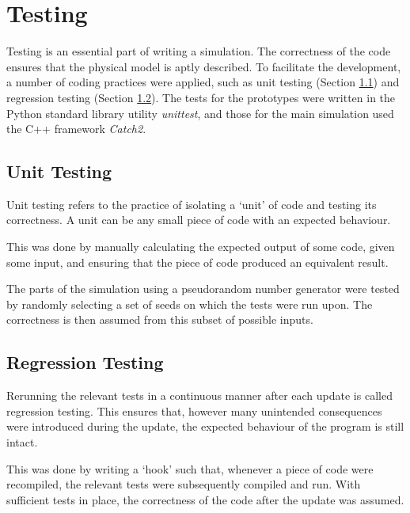 \section{Testing}
\label{sec:Testing}

Testing is an essential part of writing a simulation. The correctness of the code ensures that the physical model is aptly described. To facilitate the development, a number of coding practices were applied, such as unit testing (Section \ref{sec:UnitTesting}) and regression testing (Section \ref{sec:RegressionTesting}). The tests for the prototypes were written in the Python standard library utility \textit{unittest}, and those for the main simulation used the C++ framework \textit{Catch2}.

\subsection{Unit Testing}
\label{sec:UnitTesting}

Unit testing refers to the practice of isolating a `unit' of code and testing its correctness. A unit can be any small piece of code with an expected behaviour.

This was done by manually calculating the expected output of some code, given some input, and ensuring that the piece of code produced an equivalent result.

The parts of the simulation using a pseudorandom number generator were tested by randomly selecting a set of seeds on which the tests were run upon. The correctness is then assumed from this subset of possible inputs.

\subsection{Regression Testing}
\label{sec:RegressionTesting}

Rerunning the relevant tests in a continuous manner after each update is called regression testing. This ensures that, however many unintended consequences were introduced during the update, the expected behaviour of the program is still intact.

This was done by writing a `hook' such that, whenever a piece of code were recompiled, the relevant tests were subsequently compiled and run. With sufficient tests in place, the correctness of the code after the update was assumed.